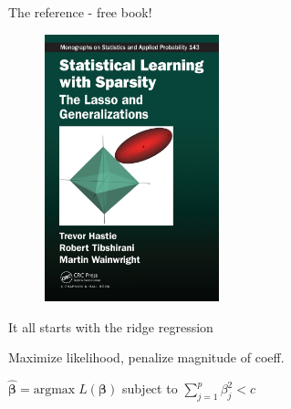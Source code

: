\documentclass[14pt]{beamer}
\begin{document}
\begin{frame}[fragile]{The reference - free book!}

{
  \begin{figure}
    \centering
    \includegraphics[width = 0.45\textwidth]{sls.jpg}
  \end{figure}
}

\end{frame}

%

\begin{frame}[fragile]{It all starts with the ridge regression}

Maximize likelihood, penalize magnitude of coeff.

$\widehat{\boldsymbol{\beta}} = \text{argmax} \; L(\boldsymbol{\beta})$ subject to $\displaystyle{\sum_{j=1}^{p}{ \beta_j^2}} < c$

\end{frame}
\end{document}
